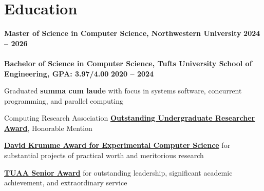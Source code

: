 \documentclass[10pt]{article}
\newenvironment{mylist}[1][]
{\itemize[nosep, wide=0pt, leftmargin=*, after=\strut]}
{\enditemize}
\begin{document}
\section{Education}
\begin{minipage}[t]{\linewidth}
    \textbf{Master of Science in Computer Science, Northwestern University } \hfill \textbf{2024 -- 2026} \\
    \vspace{-0.25cm} \\
    \textbf{Bachelor of Science in Computer Science, Tufts University School of Engineering, GPA: 3.97/4.00} \hfill \textbf{2020 -- 2024}
    \small \begin{mylist}
        \item Graduated \textbf{summa cum laude} with focus in systems software, concurrent programming, and parallel computing
        \item Computing Research Association \href{https://engineering.tufts.edu/cs/research/undergraduate-research/undergrad-research-award-nominees}{\textbf{Outstanding Undergraduate Researcher Award}}, Honorable Mention
        \item \href{https://engineering.tufts.edu/cs/news-events/awards}{\textbf{David Krumme Award for Experimental Computer Science}} for substantial projects of practical worth and meritorious research
        \item \href{https://alumniandfriends.tufts.edu/2024-senior-awardee-liam-strand-e24}{\textbf{TUAA Senior Award}} for outstanding leadership, significant academic achievement, and extraordinary service
    \end{mylist}

\end{minipage}

\end{document}
